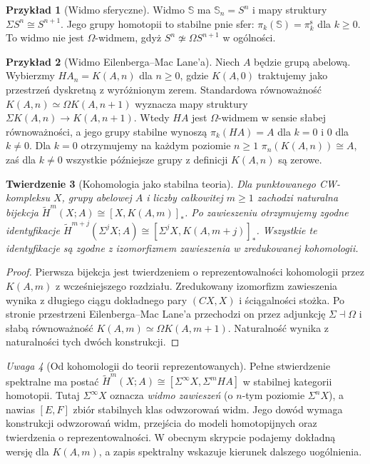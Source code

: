 \documentclass[11pt,a4paper,oneside]{report}
\theoremstyle{plain}
\newtheorem{twierdzenie}{Twierdzenie}[section]
\theoremstyle{definition}
\newtheorem{przyklad}[twierdzenie]{Przykład}
\theoremstyle{remark}
\newtheorem{uwaga}[twierdzenie]{Uwaga}
\begin{document}
\begin{przyklad}[Widmo sferyczne]
Widmo $\mathbb S$ ma $\mathbb S_n=S^n$ i mapy
struktury $\Sigma S^n\cong S^{n+1}$.
Jego grupy homotopii to stabilne pnie sfer:
$\pi_k(\mathbb S)=\pi_k^{\mathrm s}$ dla $k\ge0$.
To widmo nie jest $\Omega$-widmem, gdyż
$S^n\not\simeq\Omega S^{n+1}$ w ogólności.
\end{przyklad}

\begin{przyklad}[Widmo Eilenberga--Mac Lane'a]
Niech $A$ będzie grupą abelową. Wybierzmy
$HA_n=K(A,n)$ dla $n\ge0$, gdzie $K(A,0)$
traktujemy jako przestrzeń dyskretną z wyróżnionym zerem.
Standardowa równoważność
$K(A,n)\simeq\Omega K(A,n+1)$ wyznacza mapy
struktury $\Sigma K(A,n)\to K(A,n+1)$.
Wtedy $HA$ jest $\Omega$-widmem w sensie słabej równoważności,
a jego grupy stabilne wynoszą
$\pi_k(HA)=A$ dla $k=0$ i $0$ dla $k\ne0$.
Dla $k=0$ otrzymujemy na każdym poziomie $n\ge1$
$\pi_n(K(A,n))\cong A$, zaś dla $k\ne0$
wszystkie późniejsze grupy z definicji $K(A,n)$ są zerowe.
\end{przyklad}

\begin{twierdzenie}[Kohomologia jako stabilna teoria]
\label{thm:HA-rep-v8}
Dla punktowanego CW-kompleksu $X$, grupy abelowej $A$
i liczby całkowitej $m\ge1$ zachodzi naturalna bijekcja
$\widetilde H^m(X;A)\cong[X,K(A,m)]_*$.
Po zawieszeniu otrzymujemy zgodne identyfikacje
$\widetilde H^{m+j}(\Sigma^jX;A)
\cong[\Sigma^jX,K(A,m+j)]_*$.
Wszystkie te identyfikacje są zgodne z izomorfizmem
zawieszenia w zredukowanej kohomologii.
\end{twierdzenie}
\begin{proof}
Pierwsza bijekcja jest twierdzeniem o reprezentowalności
kohomologii przez $K(A,m)$ z wcześniejszego rozdziału.
Zredukowany izomorfizm zawieszenia wynika z długiego
ciągu dokładnego pary $(CX,X)$ i ściągalności stożka.
Po stronie przestrzeni Eilenberga--Mac Lane'a
przechodzi on przez adjunkcję $\Sigma\dashv\Omega$ i
słabą równoważność
$K(A,m)\simeq\Omega K(A,m+1)$.
Naturalność wynika z naturalności tych dwóch konstrukcji.
\end{proof}

\begin{uwaga}[Od kohomologii do teorii reprezentowanych]
Pełne stwierdzenie spektralne ma postać
$\widetilde H^m(X;A)\cong[\Sigma^\infty X,\Sigma^mHA]$
w stabilnej kategorii homotopii. Tutaj
$\Sigma^\infty X$ oznacza \emph{widmo zawieszeń}
(o $n$-tym poziomie $\Sigma^nX$), a nawias
$[E,F]$ zbiór stabilnych klas odwzorowań widm. Jego dowód wymaga
konstrukcji odwzorowań widm, przejścia do modeli
homotopijnych oraz twierdzenia o reprezentowalności.
W obecnym skrypcie podajemy dokładną wersję dla
$K(A,m)$, a zapis spektralny wskazuje kierunek
dalszego uogólnienia.
\end{uwaga}
\end{document}
